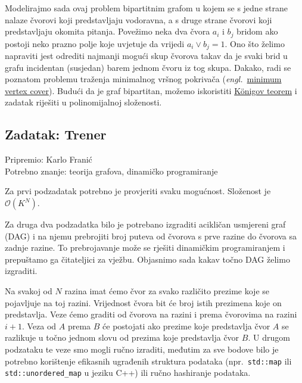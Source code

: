 \documentclass[a4paper]{article}
\begin{document}
Modelirajmo sada ovaj problem bipartitnim grafom u kojem se s jedne strane
nalaze čvorovi koji predstavljaju vodoravna, a s druge strane čvorovi koji
predstavljaju okomita pitanja. Povežimo neka dva čvora $a_i$ i $b_j$ bridom ako
postoji neko prazno polje koje uvjetuje da vrijedi $a_i \lor b_j = 1$.  Ono što
želimo napraviti jest odrediti najmanji mogući skup čvorova takav da je svaki
brid u grafu incidentan (susjedan) barem jednom čvoru iz tog skupa.  Dakako,
radi se poznatom problemu traženja minimalnog vršnog pokrivača (\textit{engl.}\
\href{https://en.wikipedia.org/wiki/Vertex\_cover}{minimum vertex cover}).
Budući da je graf bipartitan, možemo iskoristiti
\href{https://en.wikipedia.org/wiki/K%C5%91nig%27s_theorem_(graph_theory)}{K\"{o}nigov
teorem} i zadatak riješiti u polinomijalnoj složenosti.

\subsection*{Zadatak: Trener}
\textsf{Pripremio: Karlo Franić}\\
\textsf{Potrebno znanje: teorija grafova, dinamičko programiranje}

Za prvi podzadatak potrebno je provjeriti svaku mogućnost. Složenost je
$\mathcal{O}(K^N)$.

Za druga dva podzadatka bilo je potrebano izgraditi acikličan usmjereni graf
(DAG) i na njemu prebrojiti broj puteva od čvorova s prve razine do čvorova sa
zadnje razine. To prebrojavanje može se rješiti dinamičkim programiranjem i
prepuštamo ga čitateljici za vježbu. Objasnimo sada kakav točno DAG želimo
izgraditi.

Na svakoj od $N$ razina imat ćemo čvor za svako različito prezime koje se
pojavljuje na toj razini. Vrijednost čvora bit će broj istih prezimena koje on
predstavlja. Veze ćemo graditi od čvorova na razini i prema čvorovima na razini
$i+1$. Veza od $A$ prema $B$ će postojati ako prezime koje predstavlja čvor $A$
se razlikuje u točno jednom slovu od prezima koje predstavlja čvor $B$. U
drugom podzataku te veze smo mogli ručno izraditi, međutim za sve bodove bilo
je potrebno korištenje efikasnih ugrađenih struktura podataka (npr.\
\texttt{std::map} ili \texttt{std::unordered\_map} u jeziku C++) ili ručno
hashiranje podataka.
\end{document}
